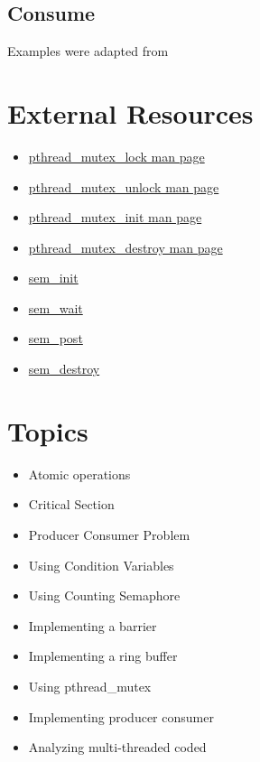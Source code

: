 
\subsection{Consume}


Examples were adapted from

\section{External Resources}

\begin{itemize}
\item \href{http://linux.die.net/man/3/pthread_mutex_lock}{pthread\_mutex\_lock man page} 
\item \href{http://linux.die.net/man/3/pthread_mutex_unlock}{pthread\_mutex\_unlock man page} 
\item \href{http://linux.die.net/man/3/pthread_mutex_init}{pthread\_mutex\_init man page} 
\item \href{http://linux.die.net/man/3/pthread_mutex_destroy}{pthread\_mutex\_destroy man page}
\item \href{http://man7.org/linux/man-pages/man3/sem_init.3.html}{sem\_init} 
\item \href{http://man7.org/linux/man-pages/man3/sem_wait.3.html}{sem\_wait} 
\item \href{http://man7.org/linux/man-pages/man3/sem_post.3.html}{sem\_post} 
\item \href{http://man7.org/linux/man-pages/man3/sem_destroy.3.html}{sem\_destroy}
\end{itemize}


\section{Topics}\label{topics}

\begin{itemize}
\tightlist
\item
  Atomic operations
\item
  Critical Section
\item
  Producer Consumer Problem
\item
  Using Condition Variables
\item
  Using Counting Semaphore
\item
  Implementing a barrier
\item
  Implementing a ring buffer
\item
  Using pthread\_mutex
\item
  Implementing producer consumer
\item
  Analyzing multi-threaded coded
\end{itemize}

